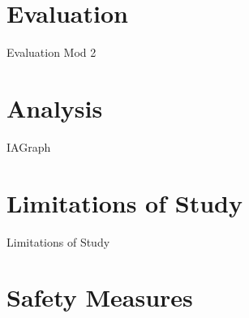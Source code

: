 \documentclass[12pt, a4paper]{article}
\begin{document}
        
        
        
        
        
        

\section{{Evaluation}}

	{Evaluation Mod 2}
        
\section{{Analysis}}
        

			{IAGraph}
        
        
        
        
\section{{Limitations of Study}}
        
        {Limitations of Study}
    
\section{{Safety Measures}}
        
\end{document}
